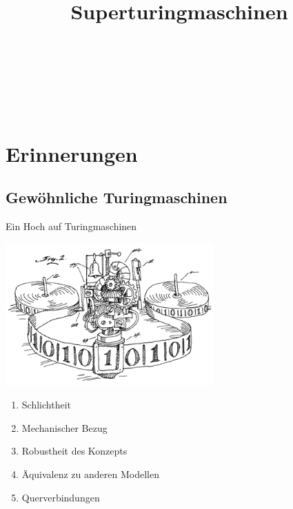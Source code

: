\documentclass[12pt,compress,ngerman,utf8,t]{beamer}
\title[Superturingmaschinen]{Superturingmaschinen}
\author[Ingo Blechschmidt]{\textcolor{white}{Ingo Blechschmidt}}
\date[2016-10-04]{\vspace*{-4em}\ \\\textcolor{white}{\scriptsize Augsburger Curry-Club \\ 4.
Oktober 2016}}
\begin{document}
{
\frame{\vspace*{12em}\titlepage}
\frame{\tableofcontents}}

\section{Erinnerungen}

\subsection{Gewöhnliche Turingmaschinen}
\begin{frame}{Ein Hoch auf Turingmaschinen}
  \begin{center}
    \includegraphics[width=0.6\textwidth]{images/turing-machine}
  \end{center}

  \begin{multicols}{2}
    \begin{enumerate}
      \item Schlichtheit
      \item Mechanischer Bezug
      \item Robustheit des Konzepts
      \item Äquivalenz zu anderen Modellen
      \item Querverbindungen
    \end{enumerate}
  \end{multicols}
\end{frame}
\end{document}
